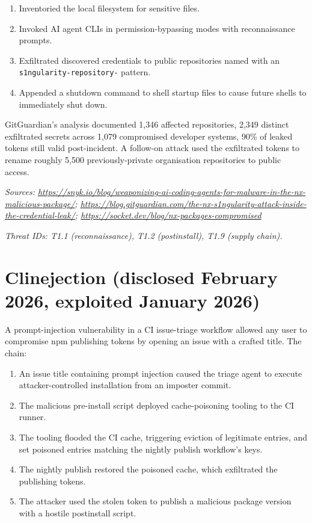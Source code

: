 \begin{enumerate}
\def\labelenumi{\arabic{enumi}.}
\tightlist
\item
  Inventoried the local filesystem for sensitive files.
\item
  Invoked AI agent CLIs in permission-bypassing modes with
  reconnaissance prompts.
\item
  Exfiltrated discovered credentials to public repositories named with
  an \texttt{s1ngularity-repository-} pattern.
\item
  Appended a shutdown command to shell startup files to cause future
  shells to immediately shut down.
\end{enumerate}

GitGuardian's analysis documented 1,346 affected repositories, 2,349
distinct exfiltrated secrets across 1,079 compromised developer systems,
90\% of leaked tokens still valid post-incident. A follow-on attack used
the exfiltrated tokens to rename roughly 5,500 previously-private
organisation repositories to public access.

\emph{Sources:
\url{https://snyk.io/blog/weaponizing-ai-coding-agents-for-malware-in-the-nx-malicious-package/};
\url{https://blog.gitguardian.com/the-nx-s1ngularity-attack-inside-the-credential-leak/};
\url{https://socket.dev/blog/nx-packages-compromised}}

\emph{Threat IDs: T1.1 (reconnaissance), T1.2 (postinstall), T1.9
(supply chain).}

\hypertarget{clinejection-disclosed-february-2026-exploited-january-2026}{%
\section{Clinejection (disclosed February 2026, exploited January
2026)}\label{clinejection-disclosed-february-2026-exploited-january-2026}}

A prompt-injection vulnerability in a CI issue-triage workflow allowed
any user to compromise npm publishing tokens by opening an issue with a
crafted title. The chain:

\begin{enumerate}
\def\labelenumi{\arabic{enumi}.}
\tightlist
\item
  An issue title containing prompt injection caused the triage agent to
  execute attacker-controlled installation from an imposter commit.
\item
  The malicious pre-install script deployed cache-poisoning tooling to
  the CI runner.
\item
  The tooling flooded the CI cache, triggering eviction of legitimate
  entries, and set poisoned entries matching the nightly publish
  workflow's keys.
\item
  The nightly publish restored the poisoned cache, which exfiltrated the
  publishing tokens.
\item
  The attacker used the stolen token to publish a malicious package
  version with a hostile postinstall script.
\end{enumerate}

